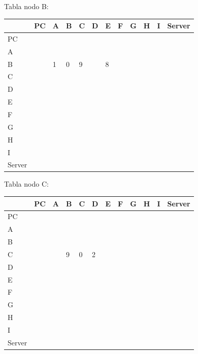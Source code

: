 \documentclass[a4paper]{article}
\begin{document}
\begin{table}[ht]
Tabla nodo B:\\
\begin{tabular}{|l|l|l|l|l|l|l|l|l|l|l|l|}
\hline
       & PC & A & B & C & D & E & F & G & H & I & Server \\ \hline
PC     &    &   &   &   &   &   &   &   &   &   &        \\ \hline
A      &    &   &   &   &   &   &   &   &   &   &        \\ \hline
B      &    & 1 & 0 & 9 &   & 8 &   &   &   &   &        \\ \hline
C      &    &   &   &   &   &   &   &   &   &   &        \\ \hline
D      &    &   &   &   &   &   &   &   &   &   &        \\ \hline
E      &    &   &   &   &   &   &   &   &   &   &        \\ \hline
F      &    &   &   &   &   &   &   &   &   &   &        \\ \hline
G      &    &   &   &   &   &   &   &   &   &   &        \\ \hline
H      &    &   &   &   &   &   &   &   &   &   &        \\ \hline
I      &    &   &   &   &   &   &   &   &   &   &        \\ \hline
Server &    &   &   &   &   &   &   &   &   &   &        \\ \hline
\end{tabular}
\end{table}



\begin{table}[ht]
Tabla nodo C:\\
\begin{tabular}{|l|l|l|l|l|l|l|l|l|l|l|l|}
\hline
       & PC & A & B & C & D & E & F & G & H & I & Server \\ \hline
PC     &    &   &   &   &   &   &   &   &   &   &        \\ \hline
A      &    &   &   &   &   &   &   &   &   &   &        \\ \hline
B      &    &   &   &   &   &   &   &   &   &   &        \\ \hline
C      &    &   & 9 & 0 & 2 &   &   &   &   &   &        \\ \hline
D      &    &   &   &   &   &   &   &   &   &   &        \\ \hline
E      &    &   &   &   &   &   &   &   &   &   &        \\ \hline
F      &    &   &   &   &   &   &   &   &   &   &        \\ \hline
G      &    &   &   &   &   &   &   &   &   &   &        \\ \hline
H      &    &   &   &   &   &   &   &   &   &   &        \\ \hline
I      &    &   &   &   &   &   &   &   &   &   &        \\ \hline
Server &    &   &   &   &   &   &   &   &   &   &        \\ \hline
\end{tabular}
\end{table}
\end{document}
